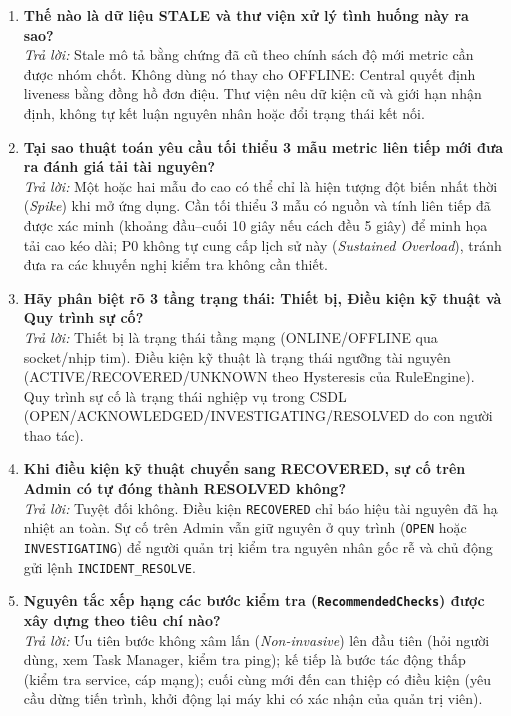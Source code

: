 \documentclass[12pt,a4paper]{article}
\begin{document}
\begin{enumerate}[label=\textbf{\arabic*.}]
  \item \textbf{Thế nào là dữ liệu STALE và thư viện xử lý tình huống này ra sao?} \\
    \textit{Trả lời:} Stale mô tả bằng chứng đã cũ theo chính sách độ mới metric cần được nhóm chốt. Không dùng nó thay cho OFFLINE: Central quyết định liveness bằng đồng hồ đơn điệu. Thư viện nêu dữ kiện cũ và giới hạn nhận định, không tự kết luận nguyên nhân hoặc đổi trạng thái kết nối.

  \item \textbf{Tại sao thuật toán yêu cầu tối thiểu 3 mẫu metric liên tiếp mới đưa ra đánh giá tải tài nguyên?} \\
    \textit{Trả lời:} Một hoặc hai mẫu đo cao có thể chỉ là hiện tượng đột biến nhất thời (\textit{Spike}) khi mở ứng dụng. Cần tối thiểu 3 mẫu có nguồn và tính liên tiếp đã được xác minh (khoảng đầu--cuối 10 giây nếu cách đều 5 giây) để minh họa tải cao kéo dài; P0 không tự cung cấp lịch sử này (\textit{Sustained Overload}), tránh đưa ra các khuyến nghị kiểm tra không cần thiết.

  \item \textbf{Hãy phân biệt rõ 3 tầng trạng thái: Thiết bị, Điều kiện kỹ thuật và Quy trình sự cố?} \\
    \textit{Trả lời:} Thiết bị là trạng thái tầng mạng (ONLINE/OFFLINE qua socket/nhịp tim). Điều kiện kỹ thuật là trạng thái ngưỡng tài nguyên (ACTIVE/RECOVERED/UNKNOWN theo Hysteresis của RuleEngine). Quy trình sự cố là trạng thái nghiệp vụ trong CSDL (OPEN/ACKNOWLEDGED/INVESTIGATING/RESOLVED do con người thao tác).

  \item \textbf{Khi điều kiện kỹ thuật chuyển sang RECOVERED, sự cố trên Admin có tự đóng thành RESOLVED không?} \\
    \textit{Trả lời:} Tuyệt đối không. Điều kiện \texttt{RECOVERED} chỉ báo hiệu tài nguyên đã hạ nhiệt an toàn. Sự cố trên Admin vẫn giữ nguyên ở quy trình (\texttt{OPEN} hoặc \texttt{INVESTIGATING}) để người quản trị kiểm tra nguyên nhân gốc rễ và chủ động gửi lệnh \texttt{INCIDENT\_RESOLVE}.

  \item \textbf{Nguyên tắc xếp hạng các bước kiểm tra (\texttt{RecommendedChecks}) được xây dựng theo tiêu chí nào?} \\
    \textit{Trả lời:} Ưu tiên bước không xâm lấn (\textit{Non-invasive}) lên đầu tiên (hỏi người dùng, xem Task Manager, kiểm tra ping); kế tiếp là bước tác động thấp (kiểm tra service, cáp mạng); cuối cùng mới đến can thiệp có điều kiện (yêu cầu dừng tiến trình, khởi động lại máy khi có xác nhận của quản trị viên).


\end{enumerate}
\end{document}
